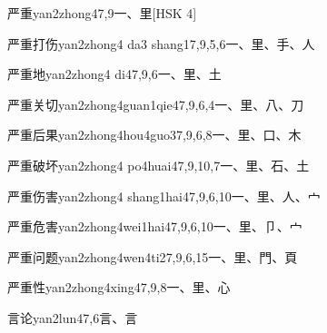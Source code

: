 \begin{entry}{严重}{yan2zhong4}{7,9}{⼀、⾥}[HSK 4]
\end{entry}

\begin{entry}{严重打伤}{yan2zhong4 da3 shang1}{7,9,5,6}{⼀、⾥、⼿、⼈}
\end{entry}

\begin{entry}{严重地}{yan2zhong4 di4}{7,9,6}{⼀、⾥、⼟}
\end{entry}

\begin{entry}{严重关切}{yan2zhong4guan1qie4}{7,9,6,4}{⼀、⾥、⼋、⼑}
\end{entry}

\begin{entry}{严重后果}{yan2zhong4hou4guo3}{7,9,6,8}{⼀、⾥、⼝、⽊}
\end{entry}

\begin{entry}{严重破坏}{yan2zhong4 po4huai4}{7,9,10,7}{⼀、⾥、⽯、⼟}
\end{entry}

\begin{entry}{严重伤害}{yan2zhong4 shang1hai4}{7,9,6,10}{⼀、⾥、⼈、⼧}
\end{entry}

\begin{entry}{严重危害}{yan2zhong4wei1hai4}{7,9,6,10}{⼀、⾥、⼙、⼧}
\end{entry}

\begin{entry}{严重问题}{yan2zhong4wen4ti2}{7,9,6,15}{⼀、⾥、⾨、⾴}
\end{entry}

\begin{entry}{严重性}{yan2zhong4xing4}{7,9,8}{⼀、⾥、⼼}
\end{entry}

\begin{entry}{言论}{yan2lun4}{7,6}{⾔、⾔}
\end{entry}

